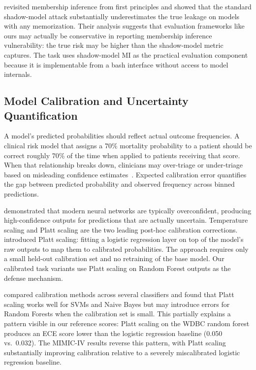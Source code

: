 \documentclass[11pt]{article}
\begin{document}
\citet{carlini2022membership} revisited membership inference from first
principles and showed that the standard shadow-model attack substantially
underestimates the true leakage on models with any memorization.
Their analysis suggests that evaluation frameworks like ours may actually
be conservative in reporting membership inference vulnerability: the true
risk may be higher than the shadow-model metric captures. The task uses
shadow-model MI as the practical evaluation component because it is
implementable from a bash interface without access to model internals.

\subsection{Model Calibration and Uncertainty Quantification}

A model's predicted probabilities should reflect actual outcome frequencies.
A clinical risk model that assigns a 70\% mortality probability to a patient
should be correct roughly 70\% of the time when applied to patients
receiving that score. When that relationship breaks down, clinicians may
over-triage or under-triage based on misleading confidence
estimates~\citep{guo2017calibration}. Expected calibration error
quantifies the gap between predicted probability and observed frequency
across binned predictions.

\citet{guo2017calibration} demonstrated that modern neural networks are
typically overconfident, producing high-confidence outputs for predictions
that are actually uncertain. Temperature scaling and Platt scaling are the
two leading post-hoc calibration corrections.
\citet{platt1999probabilistic} introduced Platt scaling: fitting a logistic
regression layer on top of the model's raw outputs to map them to calibrated
probabilities. The approach requires only a small held-out calibration set
and no retraining of the base model. Our calibrated task variants use Platt
scaling on Random Forest outputs as the defense mechanism.

\citet{niculescu2005predicting} compared calibration methods across several
classifiers and found that Platt scaling works well for SVMs and Naive Bayes
but may introduce errors for Random Forests when the calibration set is small.
This partially explains a pattern visible in our reference scores: Platt
scaling on the WDBC random forest produces an ECE score lower than the
logistic regression baseline (0.050 vs.\ 0.032). The MIMIC-IV results reverse
this pattern, with Platt scaling substantially improving calibration relative
to a severely miscalibrated logistic regression baseline.
\end{document}

